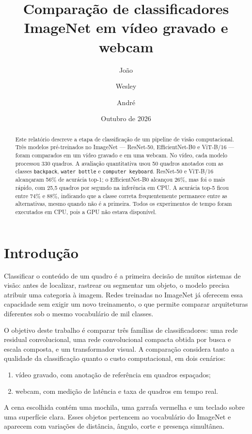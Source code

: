 \documentclass[12pt,a4paper]{article}
\title{Comparação de classificadores ImageNet em vídeo gravado e webcam}
\author{João \and Wesley \and André}
\date{Outubro de 2026}
\begin{document}
\maketitle

\begin{abstract}
Este relatório descreve a etapa de classificação de um pipeline de visão computacional.
Três modelos pré-treinados no ImageNet --- ResNet-50, EfficientNet-B0 e ViT-B/16 ---
foram comparados em um vídeo gravado e em uma webcam. No vídeo, cada modelo processou
330 quadros. A avaliação quantitativa usou 50 quadros anotados com as classes
\texttt{backpack}, \texttt{water bottle} e \texttt{computer keyboard}.
ResNet-50 e ViT-B/16 alcançaram 56\% de acurácia top-1; o EfficientNet-B0 alcançou 26\%,
mas foi o mais rápido, com 25,5 quadros por segundo na inferência em CPU.
A acurácia top-5 ficou entre 74\% e 88\%, indicando que a classe correta frequentemente
permanece entre as alternativas, mesmo quando não é a primeira.
Todos os experimentos de tempo foram executados em CPU, pois a GPU não estava disponível.
\end{abstract}

\section{Introdução}

Classificar o conteúdo de um quadro é a primeira decisão de muitos sistemas de visão:
antes de localizar, rastrear ou segmentar um objeto, o modelo precisa atribuir uma
categoria à imagem. Redes treinadas no ImageNet já oferecem essa capacidade sem exigir
um novo treinamento, o que permite comparar arquiteturas diferentes sob o mesmo vocabulário
de mil classes.

O objetivo deste trabalho é comparar três famílias de classificadores:
uma rede residual convolucional, uma rede convolucional compacta obtida por busca e
escala composta, e um transformador visual. A comparação considera tanto a qualidade
da classificação quanto o custo computacional, em dois cenários:
\begin{enumerate}
    \item vídeo gravado, com anotação de referência em quadros espaçados;
    \item webcam, com medição de latência e taxa de quadros em tempo real.
\end{enumerate}

A cena escolhida contém uma mochila, uma garrafa vermelha e um teclado sobre uma
superfície clara. Esses objetos pertencem ao vocabulário do ImageNet e aparecem com
variações de distância, ângulo, corte e presença simultânea.
\end{document}
